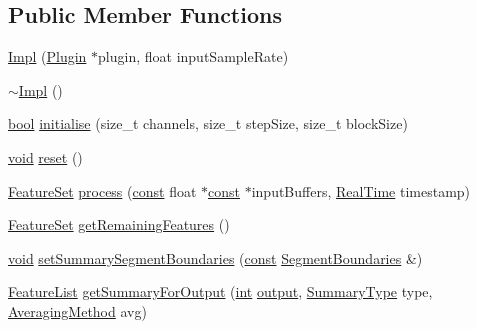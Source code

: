 \subsection*{Public Member Functions}
\begin{DoxyCompactItemize}
\item 
\hyperlink{class_vamp_1_1_host_ext_1_1_plugin_summarising_adapter_1_1_impl_ae6ca3ad75c5245e2ae6259adb0f7feca}{Impl} (\hyperlink{class_vamp_1_1_plugin}{Plugin} $\ast$plugin, float input\+Sample\+Rate)
\item 
\hyperlink{class_vamp_1_1_host_ext_1_1_plugin_summarising_adapter_1_1_impl_a24acf1dc5b580bc4050ffd67a31f3bd9}{$\sim$\+Impl} ()
\item 
\hyperlink{mac_2config_2i386_2lib-src_2libsoxr_2soxr-config_8h_abb452686968e48b67397da5f97445f5b}{bool} \hyperlink{class_vamp_1_1_host_ext_1_1_plugin_summarising_adapter_1_1_impl_a560799ad26c6985adaa7c0d1d2bdf85c}{initialise} (size\+\_\+t channels, size\+\_\+t step\+Size, size\+\_\+t block\+Size)
\item 
\hyperlink{sound_8c_ae35f5844602719cf66324f4de2a658b3}{void} \hyperlink{class_vamp_1_1_host_ext_1_1_plugin_summarising_adapter_1_1_impl_a3b67a5d0ca44d88910dcd82eb82212ae}{reset} ()
\item 
\hyperlink{class_vamp_1_1_plugin_a448fb57dc245d47923ec9eeaf9856c5f}{Feature\+Set} \hyperlink{class_vamp_1_1_host_ext_1_1_plugin_summarising_adapter_1_1_impl_a081d67545a03846059ebc6d95fcf2c6b}{process} (\hyperlink{getopt1_8c_a2c212835823e3c54a8ab6d95c652660e}{const} float $\ast$\hyperlink{getopt1_8c_a2c212835823e3c54a8ab6d95c652660e}{const} $\ast$input\+Buffers, \hyperlink{struct_vamp_1_1_real_time}{Real\+Time} timestamp)
\item 
\hyperlink{class_vamp_1_1_plugin_a448fb57dc245d47923ec9eeaf9856c5f}{Feature\+Set} \hyperlink{class_vamp_1_1_host_ext_1_1_plugin_summarising_adapter_1_1_impl_a282c9fcdd2b4d922e203af1b451fcf2c}{get\+Remaining\+Features} ()
\item 
\hyperlink{sound_8c_ae35f5844602719cf66324f4de2a658b3}{void} \hyperlink{class_vamp_1_1_host_ext_1_1_plugin_summarising_adapter_1_1_impl_add064dd691d10985a7692ac51345356f}{set\+Summary\+Segment\+Boundaries} (\hyperlink{getopt1_8c_a2c212835823e3c54a8ab6d95c652660e}{const} \hyperlink{class_vamp_1_1_host_ext_1_1_plugin_summarising_adapter_a74e7f93c745802a2409185b63922466b}{Segment\+Boundaries} \&)
\item 
\hyperlink{class_vamp_1_1_plugin_a0730bc72c87fa02eb8d2854b233f7be1}{Feature\+List} \hyperlink{class_vamp_1_1_host_ext_1_1_plugin_summarising_adapter_1_1_impl_af6d687f461a75e29ecfb7c99bb633422}{get\+Summary\+For\+Output} (\hyperlink{xmltok_8h_a5a0d4a5641ce434f1d23533f2b2e6653}{int} \hyperlink{mm_8c_aeb3fcf4ab0f02cc4420e5a97568a07ef}{output}, \hyperlink{class_vamp_1_1_host_ext_1_1_plugin_summarising_adapter_af504f810448961fc489e9b6572471705}{Summary\+Type} type, \hyperlink{class_vamp_1_1_host_ext_1_1_plugin_summarising_adapter_a294e9eed9c541dcedbaa4f2dfda1ac76}{Averaging\+Method} avg)

\end{DoxyCompactItemize}
